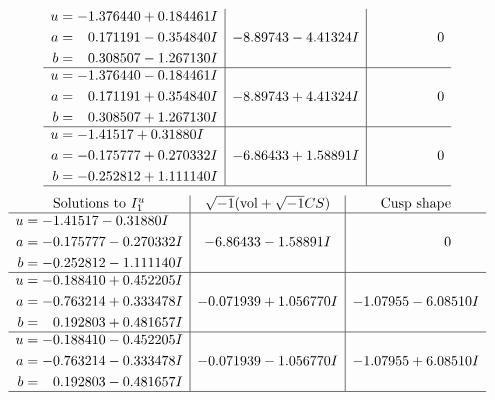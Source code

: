 \documentclass[1p]{elsarticle_modified}
\theoremstyle{definition}
\newcommand{\I}{\sqrt{-1}}
\begin{document}
$$\begin{array}{c|c|c}
\begin{aligned}
u &= -1.376440 + 0.184461 I \\
a &= \phantom{-}0.171191 - 0.354840 I \\
b &= \phantom{-}0.308507 - 1.267130 I\end{aligned}
 & -8.89743 - 4.41324 I & \phantom{-0.000000 } 0 \\ \hline\begin{aligned}
u &= -1.376440 - 0.184461 I \\
a &= \phantom{-}0.171191 + 0.354840 I \\
b &= \phantom{-}0.308507 + 1.267130 I\end{aligned}
 & -8.89743 + 4.41324 I & \phantom{-0.000000 } 0 \\ \hline\begin{aligned}
u &= -1.41517 + 0.31880 I \\
a &= -0.175777 + 0.270332 I \\
b &= -0.252812 + 1.111140 I\end{aligned}
 & -6.86433 + 1.58891 I & \phantom{-0.000000 } 0\\
 \hline 
 \end{array}$$\newpage$$\begin{array}{c|c|c}  
\text{Solutions to }I^u_{1}& \I (\text{vol} + \sqrt{-1}CS) & \text{Cusp shape}\\
 \hline 
\begin{aligned}
u &= -1.41517 - 0.31880 I \\
a &= -0.175777 - 0.270332 I \\
b &= -0.252812 - 1.111140 I\end{aligned}
 & -6.86433 - 1.58891 I & \phantom{-0.000000 } 0 \\ \hline\begin{aligned}
u &= -0.188410 + 0.452205 I \\
a &= -0.763214 + 0.333478 I \\
b &= \phantom{-}0.192803 + 0.481657 I\end{aligned}
 & -0.071939 + 1.056770 I & -1.07955 - 6.08510 I \\ \hline\begin{aligned}
u &= -0.188410 - 0.452205 I \\
a &= -0.763214 - 0.333478 I \\
b &= \phantom{-}0.192803 - 0.481657 I\end{aligned}
 & -0.071939 - 1.056770 I & -1.07955 + 6.08510 I\\
 \hline 
 \end{array}$$\newpage\newpage\renewcommand{\arraystretch}{1}
\end{document}
